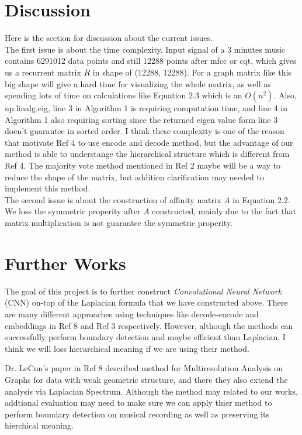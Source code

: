 \documentclass[final]{siamltexmm}
\begin{document}
\section{Discussion}
Here is the section for discussion about the current issues.\\
The first issue is about the time complexity. Input signal of a 3 minutes music contains 6291012 data points and still 12288 points after mfcc or cqt, which gives us a recurrent matrix $R$ in shape of (12288, 12288). For a graph matrix like this big shape will give a hard time for visualizing the whole matrix, as well as spending lots of time on calculations like Equation 2.3 which is an $O(n^2)$. Also, np.linalg.eig, line 3 in Algorithm 1 is requiring computation time, and line 4 in Algorithm 1 also requiring sorting since the returned eigen value form line 3 doen't guarantee in sorted order. I think these complexity is one of the reason that motivate Ref 4 to use encode and decode method, but the advantage of our method is able to understange the hierarchical structure which is different from Ref 4. The majority vote method mentioned in Ref 2 maybe will be a way to reduce the shape of the matrix, but addition clarification may needed to implement this method.\\
The second issue is about the construction of affinity matrix $A$ in Equation 2.2. We loss the symmetric properity after $A$ constructed, mainly due to the fact that matrix multiplication is not guarantee the symmetric properity.

\section{Further Works}
The goal of this project is to further construct \textit{Convolutional Neural Network} (CNN) on-top of the Laplacian formula that we have constructed above. There are many different approaches using techniques like decode-encode and embeddings in Ref 8 and Ref 3 respectively. However, although the methods can successfully perform boundary detection and maybe efficient than Laplacian, I think we will loss hierarchical meaning if we are using their method.

Dr. LeCun's paper in Ref 8 described method for Multiresolution Analysis on Graphs for data with weak geometric structure, and there they also extend the analysis via Laplacian Spectrum. Although the method may related to our works, addtional evaluation may need to make sure we can apply thier method to perform boundary detection on musical recording as well as preserving its hierchical meaning.
\end{document}
